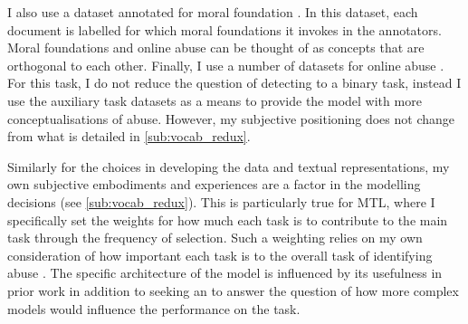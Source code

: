 I also use a dataset annotated for moral foundation \citep{Hoover:2019}.
In this dataset, each document is labelled for which moral foundations it invokes in the annotators.
Moral foundations and online abuse can be thought of as concepts that are orthogonal to each other. 
Finally, I use a number of datasets for online abuse \citep{Garcia:2018,Waseem:2016,Waseem-Hovy:2016,Davidson:2017,Wulczyn:2016}.
For this task, I do not reduce the question of detecting to a binary task, instead I use the auxiliary task datasets as a means to provide the model with more conceptualisations of abuse.
However, my subjective positioning does not change from what is detailed in \autoref{sub:vocab_redux}.

Similarly for the choices in developing the data and textual representations, my own subjective embodiments and experiences are a factor in the modelling decisions (see \cref{sub:vocab_redux}).
This is particularly true for MTL, where I specifically set the weights for how much each task is to contribute to the main task through the frequency of selection.
Such a weighting relies on my own consideration of how important each task is to the overall task of identifying abuse .
The specific architecture of the model is influenced by its usefulness in prior work \citep{Bingel:2018} in addition to seeking an to answer the question of how more complex models would influence the performance on the task.

